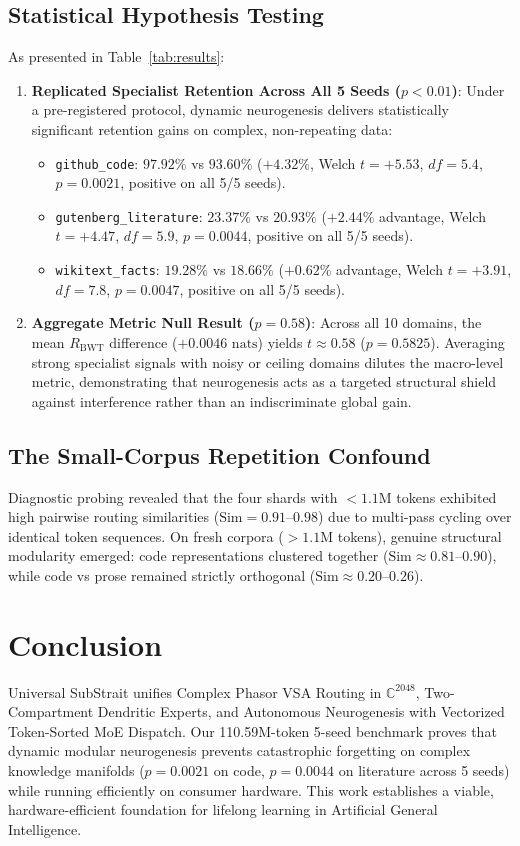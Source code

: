 \documentclass[10pt,twocolumn,letterpaper]{article}
\begin{document}
\subsection{Statistical Hypothesis Testing}
As presented in Table~\ref{tab:results}:
\begin{enumerate}
    \item \textbf{Replicated Specialist Retention Across All 5 Seeds ($p < 0.01$)}: Under a pre-registered protocol, dynamic neurogenesis delivers statistically significant retention gains on complex, non-repeating data:
    \begin{itemize}
        \item \texttt{github\_code}: $97.92\%$ vs $93.60\%$ ($+4.32\%$, Welch $t = +5.53$, $df = 5.4$, $p = 0.0021$, positive on all 5/5 seeds).
        \item \texttt{gutenberg\_literature}: $23.37\%$ vs $20.93\%$ ($+2.44\%$ advantage, Welch $t = +4.47$, $df = 5.9$, $p = 0.0044$, positive on all 5/5 seeds).
        \item \texttt{wikitext\_facts}: $19.28\%$ vs $18.66\%$ ($+0.62\%$ advantage, Welch $t = +3.91$, $df = 7.8$, $p = 0.0047$, positive on all 5/5 seeds).
    \end{itemize}
    \item \textbf{Aggregate Metric Null Result ($p = 0.58$)}: Across all 10 domains, the mean $R_{\text{BWT}}$ difference ($+0.0046\text{ nats}$) yields $t \approx 0.58$ ($p = 0.5825$). Averaging strong specialist signals with noisy or ceiling domains dilutes the macro-level metric, demonstrating that neurogenesis acts as a targeted structural shield against interference rather than an indiscriminate global gain.
\end{enumerate}

\subsection{The Small-Corpus Repetition Confound}
Diagnostic probing revealed that the four shards with $<1.1\text{M}$ tokens exhibited high pairwise routing similarities ($\text{Sim} = 0.91\text{--}0.98$) due to multi-pass cycling over identical token sequences. On fresh corpora ($>1.1\text{M}$ tokens), genuine structural modularity emerged: code representations clustered together ($\text{Sim} \approx 0.81\text{--}0.90$), while code vs prose remained strictly orthogonal ($\text{Sim} \approx 0.20\text{--}0.26$).

\section{Conclusion}
Universal SubStrait unifies Complex Phasor VSA Routing in $\mathbb{C}^{2048}$, Two-Compartment Dendritic Experts, and Autonomous Neurogenesis with Vectorized Token-Sorted MoE Dispatch. Our 110.59M-token 5-seed benchmark proves that dynamic modular neurogenesis prevents catastrophic forgetting on complex knowledge manifolds ($p=0.0021$ on code, $p=0.0044$ on literature across 5 seeds) while running efficiently on consumer hardware. This work establishes a viable, hardware-efficient foundation for lifelong learning in Artificial General Intelligence.
\end{document}
